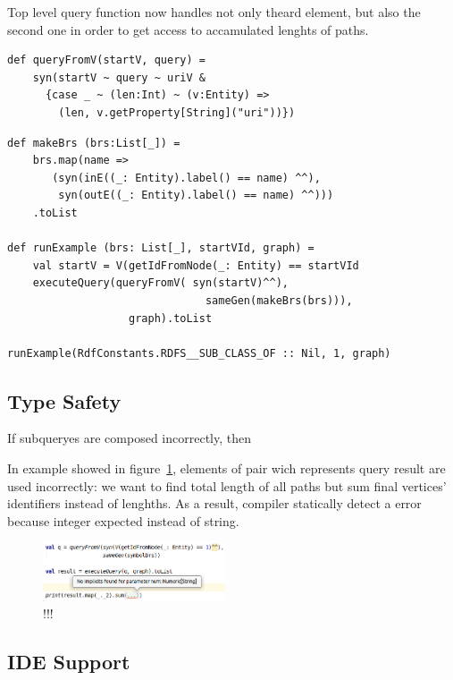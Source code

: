 Top level query function now handles not only theard element, but also the second one in order to get access to accamulated lenghts of paths.

\begin{lstlisting}
def queryFromV(startV, query) =
    syn(startV ~ query ~ uriV &
      {case _ ~ (len:Int) ~ (v:Entity) =>
        (len, v.getProperty[String]("uri"))})
\end{lstlisting}

\begin{lstlisting}
def makeBrs (brs:List[_]) =
    brs.map(name =>
       (syn(inE((_: Entity).label() == name) ^^),
        syn(outE((_: Entity).label() == name) ^^)))
    .toList
    
def runExample (brs: List[_], startVId, graph) =
    val startV = V(getIdFromNode(_: Entity) == startVId
    executeQuery(queryFromV( syn(startV)^^),
                               sameGen(makeBrs(brs))),
                   graph).toList

runExample(RdfConstants.RDFS__SUB_CLASS_OF :: Nil, 1, graph)
\end{lstlisting}



\subsection{Type Safety}

If subqueryes are composed incorrectly, then

In example showed in figure~\ref{fig:types}, elements of pair wich represents query result are used incorrectly: we want to find total length of all paths but sum final vertices' identifiers instead of lenghths.
As a result, compiler statically detect a error because integer expected instead of string.

\begin{figure}[ht]
   \includegraphics[width=0.48\textwidth]{pictures/image.png}
   \caption{!!!}
   \label{fig:types}
\end{figure}

\subsection{IDE Support}

